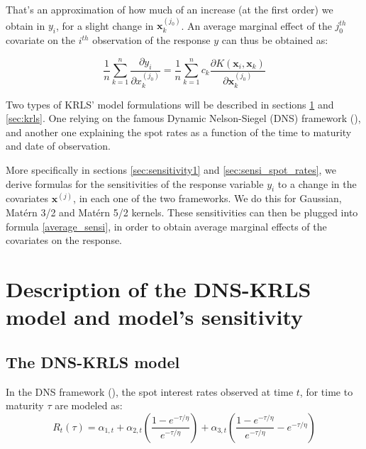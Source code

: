 \medskip

That's an approximation of how much of an increase (at the first order) we obtain in $y_i$,  for a slight change in $\textbf{x}_k^{(j_0)}$. An average marginal effect of the $j_0^{th}$ covariate on the $i^{th}$ observation of the response $y$ can thus be obtained as:

\begin{equation}
\label{average_sensi}
\frac{1}{n}\sum_{k = 1}^n \frac{\partial y_i}{\partial x_k^{(j_0)}} = \frac{1}{n}\sum_{k = 1}^n c_k \frac{\partial K(\textbf{x}_i, \textbf{x}_k)}{\partial \textbf{x}_k^{(j_0)}}
\end{equation}

Two types of KRLS' model formulations will be described in sections \ref{sec:dnskrls} and \ref{sec:krls}. One relying on the famous Dynamic Nelson-Siegel (DNS) framework (\cite{diebold2006forecasting}), and another one explaining the spot rates as a function of the time to maturity and date of observation. 

More specifically in sections \ref{sec:sensitivity1} and \ref{sec:sensi_spot_rates}, we derive formulas for the sensitivities of the response variable $y_i$ to a change in the covariates $\textbf{x}^{(j)}$, in each one of the two frameworks. We do this for Gaussian, Mat\'ern 3/2 and Mat\'ern 5/2 kernels. These sensitivities can then be plugged into formula \ref{average_sensi}, in order to obtain average marginal effects of the covariates on the response.

\section{Description of the DNS-KRLS model and model's sensitivity}
\label{sec:dnskrls}

\subsection{The DNS-KRLS model}

In the DNS framework (\cite{diebold2006forecasting}), the spot interest rates observed at time $t$, for time to maturity $\tau$ are modeled as:
\begin{equation}
R_t(\tau) = \alpha_{1, t} + \alpha_{2, t}\left(\frac{1-e^{-\tau/\eta}}{e^{-\tau/\eta}}\right) + \alpha_{3, t}\left(\frac{1-e^{-\tau/\eta}}{e^{-\tau/\eta}} - e^{-\tau/\eta}\right)
\end{equation}

\medskip

